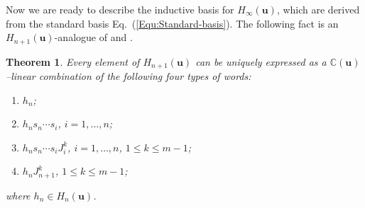 \documentclass[a4paper, oneside]{amsart}
\numberwithin{equation}{section}
\newtheorem{theorem}[equation]{Theorem}
\theoremstyle{definition}
\theoremstyle{remark}
\begin{document}
Now we are ready to describe the inductive basis for \(H_{\infty}(\boldsymbol{u})\), which are derived from the standard basis Eq.~(\ref{Equ:Standard-basis}). The following fact is an \(H_{n+1}(\boldsymbol{u})\)-analogue of \cite[(4.4)]{Jones} and \cite[Theorem~2]{L}.
\begin{theorem}\label{Them:Inductive-basis}
Every element of \(H_{n+1}(\boldsymbol{u})\) can be uniquely expressed as a $\mathbb{C}(\boldsymbol{u})$--linear combination of the following four types of words:
\begin{enumerate}
  \item[(I)] $h_{n}$;
  \item[(II)] $h_{n}s_n \cdots s_i$, $i = 1, \ldots, n$;
  \item[(III)] $h_{n}s_n \cdots s_i J_{i}^k$, $i = 1, \ldots, n$, $1 \leq k\leq m-1$;
  \item[(IV)] $h_{n}J_{n+1}^k$, $1 \leq k \leq m-1$;
\end{enumerate}
where \(h_{n} \in H_n(\boldsymbol{u})\).
\end{theorem}
\end{document}

